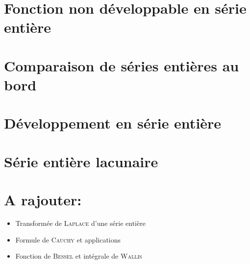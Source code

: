 \section{Fonction non développable en série entière}


\section{Comparaison de séries entières au bord}


\section{Développement en série entière}


\section{Série entière lacunaire}



\section{A rajouter:}
\begin{itemize}
    \item Transformée de \textsc{Laplace} d'une série entière
    \item Formule de \textsc{Cauchy} et applications
    \item Fonction de \textsc{Bessel} et intégrale de \textsc{Wallis}
\end{itemize}
